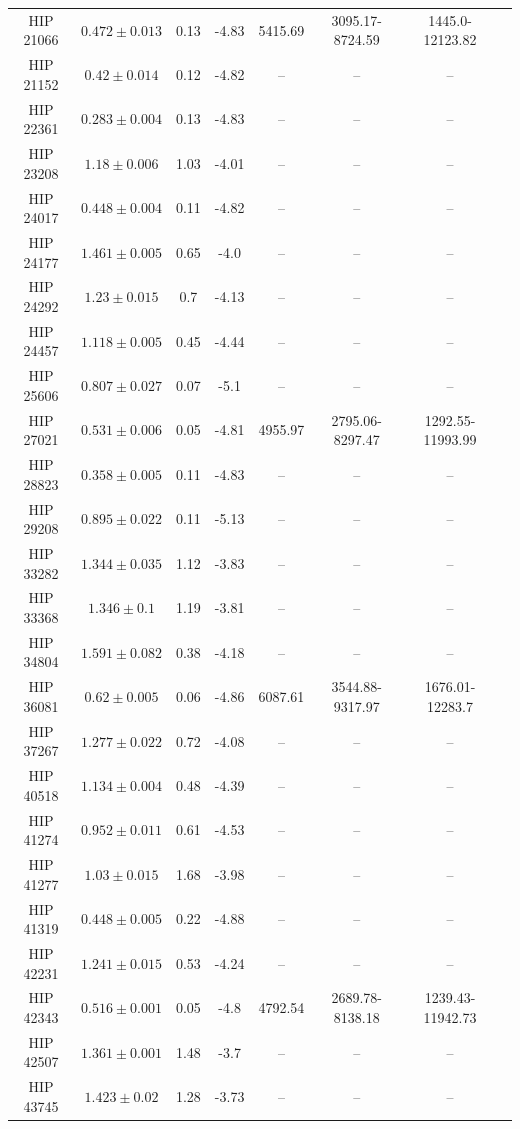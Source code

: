 \begin{longtable}{|c|c|c|c|c|c|c|c|}
HIP 21066 & $ 0.472 \pm 0.013 $ & 0.13 & -4.83 & 5415.69 & 3095.17-8724.59 & 1445.0-12123.82 \\
HIP 21152 & $ 0.42 \pm 0.014 $ & 0.12 & -4.82 &-- &-- &-- \\
HIP 22361 & $ 0.283 \pm 0.004 $ & 0.13 & -4.83 &-- &-- &-- \\
HIP 23208 & $ 1.18 \pm 0.006 $ & 1.03 & -4.01 &-- &-- &-- \\
HIP 24017 & $ 0.448 \pm 0.004 $ & 0.11 & -4.82 &-- &-- &-- \\
HIP 24177 & $ 1.461 \pm 0.005 $ & 0.65 & -4.0 &-- &-- &-- \\
HIP 24292 & $ 1.23 \pm 0.015 $ & 0.7 & -4.13 &-- &-- &-- \\
HIP 24457 & $ 1.118 \pm 0.005 $ & 0.45 & -4.44 &-- &-- &-- \\
HIP 25606 & $ 0.807 \pm 0.027 $ & 0.07 & -5.1 &-- &-- &-- \\
HIP 27021 & $ 0.531 \pm 0.006 $ & 0.05 & -4.81 & 4955.97 & 2795.06-8297.47 & 1292.55-11993.99 \\
HIP 28823 & $ 0.358 \pm 0.005 $ & 0.11 & -4.83 &-- &-- &-- \\
HIP 29208 & $ 0.895 \pm 0.022 $ & 0.11 & -5.13 &-- &-- &-- \\
HIP 33282 & $ 1.344 \pm 0.035 $ & 1.12 & -3.83 &-- &-- &-- \\
HIP 33368 & $ 1.346 \pm 0.1 $ & 1.19 & -3.81 &-- &-- &-- \\
HIP 34804 & $ 1.591 \pm 0.082 $ & 0.38 & -4.18 &-- &-- &-- \\
HIP 36081 & $ 0.62 \pm 0.005 $ & 0.06 & -4.86 & 6087.61 & 3544.88-9317.97 & 1676.01-12283.7 \\
HIP 37267 & $ 1.277 \pm 0.022 $ & 0.72 & -4.08 &-- &-- &-- \\
HIP 40518 & $ 1.134 \pm 0.004 $ & 0.48 & -4.39 &-- &-- &-- \\
HIP 41274 & $ 0.952 \pm 0.011 $ & 0.61 & -4.53 &-- &-- &-- \\
HIP 41277 & $ 1.03 \pm 0.015 $ & 1.68 & -3.98 &-- &-- &-- \\
HIP 41319 & $ 0.448 \pm 0.005 $ & 0.22 & -4.88 &-- &-- &-- \\
HIP 42231 & $ 1.241 \pm 0.015 $ & 0.53 & -4.24 &-- &-- &-- \\
HIP 42343 & $ 0.516 \pm 0.001 $ & 0.05 & -4.8 & 4792.54 & 2689.78-8138.18 & 1239.43-11942.73 \\
HIP 42507 & $ 1.361 \pm 0.001 $ & 1.48 & -3.7 &-- &-- &-- \\
HIP 43745 & $ 1.423 \pm 0.02 $ & 1.28 & -3.73 &-- &-- &-- \\

\end{longtable}
